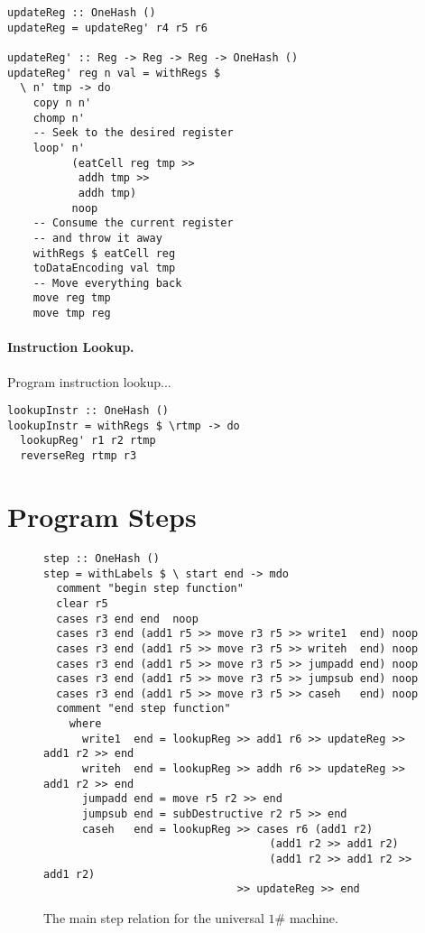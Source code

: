 \documentclass[10pt, preprint, nocopyrightspace]{sigplanconf}
\newcommand{\oh}{$1\#$\xspace}
\begin{document}
\begin{lstlisting}
updateReg :: OneHash ()
updateReg = updateReg' r4 r5 r6

updateReg' :: Reg -> Reg -> Reg -> OneHash ()
updateReg' reg n val = withRegs $ 
  \ n' tmp -> do
    copy n n'
    chomp n'
    -- Seek to the desired register
    loop' n' 
          (eatCell reg tmp >> 
           addh tmp >> 
           addh tmp) 
          noop
    -- Consume the current register 
    -- and throw it away
    withRegs $ eatCell reg
    toDataEncoding val tmp
    -- Move everything back
    move reg tmp
    move tmp reg
\end{lstlisting}

\paragraph{Instruction Lookup.}

Program instruction lookup...

\begin{lstlisting}
lookupInstr :: OneHash ()
lookupInstr = withRegs $ \rtmp -> do
  lookupReg' r1 r2 rtmp
  reverseReg rtmp r3
\end{lstlisting}

\section{Program Steps}

\begin{figure*}
\begin{lstlisting}
step :: OneHash () 
step = withLabels $ \ start end -> mdo 
  comment "begin step function" 
  clear r5 
  cases r3 end end  noop 
  cases r3 end (add1 r5 >> move r3 r5 >> write1  end) noop 
  cases r3 end (add1 r5 >> move r3 r5 >> writeh  end) noop 
  cases r3 end (add1 r5 >> move r3 r5 >> jumpadd end) noop 
  cases r3 end (add1 r5 >> move r3 r5 >> jumpsub end) noop 
  cases r3 end (add1 r5 >> move r3 r5 >> caseh   end) noop 
  comment "end step function" 
    where 
      write1  end = lookupReg >> add1 r6 >> updateReg >> add1 r2 >> end 
      writeh  end = lookupReg >> addh r6 >> updateReg >> add1 r2 >> end 
      jumpadd end = move r5 r2 >> end 
      jumpsub end = subDestructive r2 r5 >> end 
      caseh   end = lookupReg >> cases r6 (add1 r2) 
                                   (add1 r2 >> add1 r2) 
                                   (add1 r2 >> add1 r2 >> add1 r2) 
                              >> updateReg >> end 
\end{lstlisting}
\caption{The main step relation for the universal \oh machine.}
\end{figure*}
\end{document}
